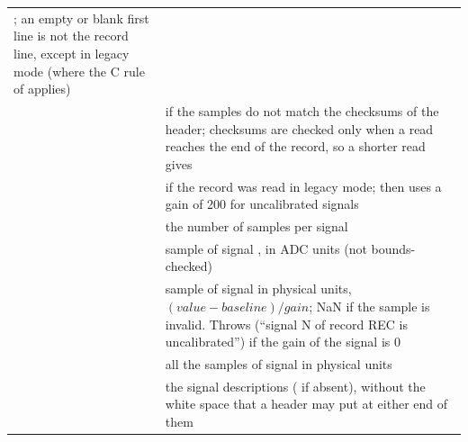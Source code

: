 \begin{xltabular}{\linewidth}{@{}lL@{}}
  \code{\#}; an empty or blank first line is not the record line, except in legacy mode
  (where the C rule of  applies) \\
 &  if the samples do not match the checksums of the
  header; checksums are checked only when a read reaches the end of the record, so a
  shorter read gives  \\
 &  if the record was read in legacy mode; 
  then uses a gain of 200 for uncalibrated signals \\
 & the number of samples per signal \\
 & sample  of signal , in ADC
  units (not bounds-checked) \\
 & sample  of signal  in
  physical units, $(\mathit{value} - \mathit{baseline}) / \mathit{gain}$; NaN if the
  sample is invalid. Throws  (``signal N of record REC is uncalibrated'') if
  the gain of the signal is 0 \\
 & all the samples of signal
   in physical units \\
 & the signal descriptions ( if
  absent), without the white space that a header may put at either end of them \\
\end{xltabular}

